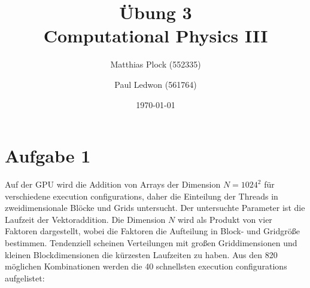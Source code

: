 \documentclass[10pt,a4paper]{article}
\title{Übung 3 \\Computational Physics III}
\author{Matthias Plock (552335) \and Paul Ledwon (561764)} %
\date{\today}
\begin{document}
\maketitle
\tableofcontents

\pagestyle{myheadings}                  %

\section{Aufgabe 1}

Auf der GPU wird die Addition von Arrays der Dimension $N=1024^2$ für verschiedene execution configurations, daher die Einteilung der Threads in zweidimensionale Blöcke und Grids untersucht. Der untersuchte Parameter ist die Laufzeit der Vektoraddition.
Die Dimension $N$ wird als Produkt von vier Faktoren dargestellt, wobei die Faktoren die
Aufteilung in Block- und Gridgröße bestimmen.
Tendenziell scheinen Verteilungen mit großen Griddimensionen und kleinen Blockdimensionen die kürzesten Laufzeiten zu haben.
Aus den 820 möglichen Kombinationen werden die 40 schnellsten execution configurations aufgelistet:
\end{document}
